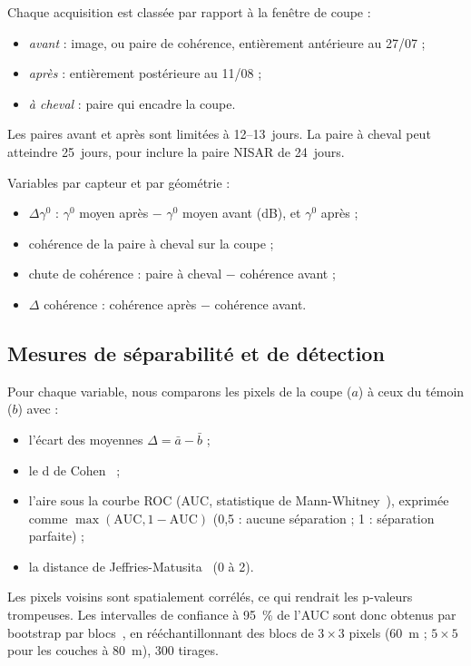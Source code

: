 \documentclass[11pt,a4paper]{article}
\begin{document}
Chaque acquisition est classée par rapport à la fenêtre de coupe :
\begin{itemize}
\item \emph{avant} : image, ou paire de cohérence, entièrement antérieure au 27/07 ;
\item \emph{après} : entièrement postérieure au 11/08 ;
\item \emph{à cheval} : paire qui encadre la coupe.
\end{itemize}
Les paires avant et après sont limitées à 12--13~jours. La paire à cheval peut atteindre 25~jours, pour
inclure la paire NISAR de 24~jours.

Variables par capteur et par géométrie :
\begin{itemize}
\item $\Delta\gamma^0$ : $\gamma^0$ moyen après $-$ $\gamma^0$ moyen avant (dB), et $\gamma^0$ après ;
\item cohérence de la paire à cheval sur la coupe ;
\item chute de cohérence : paire à cheval $-$ cohérence avant ;
\item $\Delta$ cohérence : cohérence après $-$ cohérence avant.
\end{itemize}

\subsection{Mesures de séparabilité et de détection}

Pour chaque variable, nous comparons les pixels de la coupe ($a$) à ceux du témoin ($b$) avec :
\begin{itemize}
\item l'écart des moyennes $\Delta=\bar a-\bar b$ ;
\item le d de Cohen~\cite{cohen1988power} ;
\item l'aire sous la courbe ROC (AUC, statistique de Mann-Whitney~\cite{hanley1982auc}), exprimée comme
  $\max(\mathrm{AUC}, 1-\mathrm{AUC})$ (0,5 : aucune séparation ; 1 : séparation parfaite) ;
\item la distance de Jeffries-Matusita~\cite{swain1978remote} (0 à 2).
\end{itemize}
Les pixels voisins sont spatialement corrélés, ce qui rendrait les p-valeurs trompeuses. Les intervalles de
confiance à 95~\% de l'AUC sont donc obtenus par bootstrap par blocs~\cite{kunsch1989bootstrap}, en rééchantillonnant
des blocs de $3\times3$ pixels (60~m ; $5\times5$ pour les couches à 80~m), 300 tirages.
\end{document}
